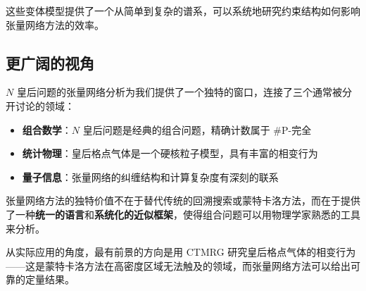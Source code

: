 \documentclass[12pt,a4paper]{ctexart}
\begin{document}
这些变体模型提供了一个从简单到复杂的谱系，可以系统地研究约束结构如何影响张量网络方法的效率。

\subsection{更广阔的视角}

$N$ 皇后问题的张量网络分析为我们提供了一个独特的窗口，连接了三个通常被分开讨论的领域：

\begin{itemize}
\item \textbf{组合数学}：$N$ 皇后问题是经典的组合问题，精确计数属于 \#P-完全
\item \textbf{统计物理}：皇后格点气体是一个硬核粒子模型，具有丰富的相变行为
\item \textbf{量子信息}：张量网络的纠缠结构和计算复杂度有深刻的联系
\end{itemize}

张量网络方法的独特价值不在于替代传统的回溯搜索或蒙特卡洛方法，而在于提供了一种\textbf{统一的语言}和\textbf{系统化的近似框架}，使得组合问题可以用物理学家熟悉的工具来分析。

从实际应用的角度，最有前景的方向是用 CTMRG 研究皇后格点气体的相变行为——这是蒙特卡洛方法在高密度区域无法触及的领域，而张量网络方法可以给出可靠的定量结果。
\end{document}
